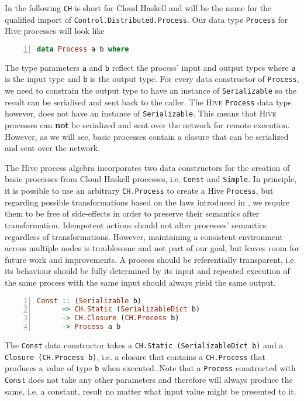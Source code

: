In the following \texttt{CH} is short for Cloud Haskell and will be the name for the qualified import of \texttt{Control.Distributed.Process}. Our data type \texttt{Process} for Hive processes will look like
\begin{lstlisting}[language=Haskell,caption=Data type for \textsc{Hive} processes.,numbers=left,frame=bt]
data Process a b where
\end{lstlisting}
The type parameters \texttt{a} and \texttt{b} reflect the process' input and output types where \texttt{a} is the input type and \texttt{b} is the output type. For every data constructor of \texttt{Process}, we need to constrain the output type to have an instance of \texttt{Serializable} so the result can be serialised and sent back to the caller. The \textsc{Hive} \texttt{Process} data type however, does not have an instance of \texttt{Serializable}. This means that \textsc{Hive} processes can \textbf{not} be serialized and sent over the network for remote execution. However, as we will see, basic processes contain a closure that can be serialized and sent over the network.

The Hive process algebra incorporates two data constructors for the creation of basic processes from Cloud Haskell processes, i.e. \texttt{Const} and \texttt{Simple}. In principle, it is possible to use an arbitrary \texttt{CH.Process} to create a Hive \texttt{Process}, but regarding possible transformations based on the laws introduced in , we require them to be free of side-effects in order to preserve their semantics after transformation. Idempotent actions should not alter processes' semantics regardless of transformations. However, maintaining a consistent environment across multiple nodes is troublesome and not part of our goal, but leaves room for future work and improvements. A process should be referentially transparent, i.e. its behaviour should be fully determined by its input and repeated execution of the same process with the same input should always yield the same output.
\begin{lstlisting}[language=Haskell,caption=Signature of the \texttt{Const} type constructor.,numbers=left,frame=bt]
Const :: (Serializable b) 
      => CH.Static (SerializableDict b)
      -> CH.Closure (CH.Process b)
      -> Process a b
\end{lstlisting}
The \texttt{Const} data constructor takes a \texttt{CH.Static (SerializableDict b)} and a \texttt{Closure (CH.Process b)}, i.e. a closure that contains a \texttt{CH.Process} that produces a value of type \texttt{b} when executed. Note that a \texttt{Process} constructed with \texttt{Const} does not take any other parameters and therefore will always produce the same, i.e. a constant, result no matter what input value might be presented to it. 

